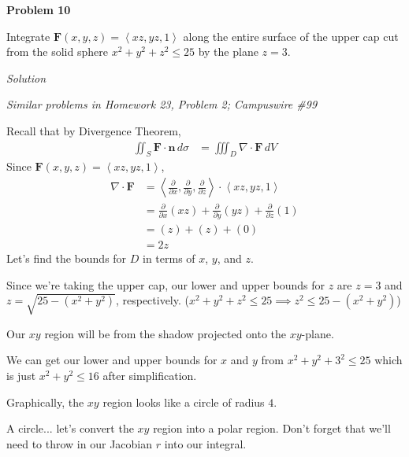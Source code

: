\documentclass{article}
\newcommand{\lrp}[1]{\left( #1 \right)}
\newcommand{\lra}[1]{\left\langle #1 \right\rangle}
\newcommand{\F}[0]{\mathbf{F}}
\newcommand{\n}[0]{{\mathbf{n}}}
\newcommand{\Solution}{\textit{Solution}}
\begin{document}
{}\textbf{Problem 10}

Integrate $\F(x,y,z)=\lra{xz,yz,1}$ along the entire surface of the upper cap cut from the solid sphere $x^2+y^2+z^2\leq25$ by the plane $z=3$.

\Solution

\textit{Similar problems in Homework 23, Problem 2; Campuswire \#99}

Recall that by Divergence Theorem,
\begin{align*}
    \iint_S \F\cdot \n\,d\sigma &=\iiint_D \nabla \cdot \F\,dV
\end{align*}
Since $\F(x,y,z)=\lra{xz,yz,1}$,
\begin{align*}
    \nabla \cdot \F &= \lra{\frac{\partial }{\partial x},\frac{\partial }{\partial y},\frac{\partial }{\partial z}}\cdot \lra{xz,yz,1}\\
    &=\frac{\partial }{\partial x}\lrp{xz}+\frac{\partial }{\partial y}\lrp{yz}+\frac{\partial }{\partial z}\lrp{1}\\
    &=\lrp{z}+\lrp{z}+\lrp{0}\\
    &=2z
\end{align*}
Let's find the bounds for $D$ in terms of $x$, $y$, and $z$.

Since we're taking the upper cap, our lower and upper bounds for $z$ are $z=3$ and  $z=\sqrt{25-(x^2+y^2)}$, respectively. ($x^2+y^2+z^2\leq 25 \implies z^2 \leq 25 - (x^2+y^2)$)

Our $xy$ region will be from the shadow projected onto the $xy$-plane.

We can get our lower and upper bounds for $x$ and $y$ from $x^2+y^2+3^2\leq 25$ which is just $x^2+y^2\leq 16$ after simplification.

Graphically, the $xy$ region looks like a circle of radius $4$.
\begin{center}
\end{center}
A circle... let's convert the $xy$ region into a polar region. Don't forget that we'll need to throw in our Jacobian $r$ into our integral.
\end{document}
